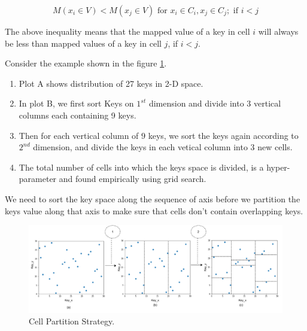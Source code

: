     $$ M(x_{i} \in V) <  M(x_{j} \in V) \text{ for } x_{i} \in C_{i}, x_{j} \in C_{j}; \text{ if } i<j$$
    
The above inequality means that the mapped value of a key in cell $i$ will always be less than mapped values of a key in cell $j$, if $i <j$.

\begin{mscexample}
	Consider the example shown in the figure \ref{fig:Cell_Parttion}.
	\begin{enumerate}
		\item Plot A shows distribution of 27 keys in 2-D space. 
		\item In plot B, we first sort Keys on $1^{st}$ dimension and divide into 3 vertical columns each containing 9 keys. 
		\item Then for each vertical column of $9$ keys, we sort the keys again according to $2^{nd}$ dimension, and divide the keys in each vetical column into $3$ new cells. 
		\item The total number of cells into which the keys space is divided, is a hyper-parameter and found empirically using grid search.
	\end{enumerate}
\end{mscexample}

We need to sort the key space along the sequence of axis before we partition the keys value along that axis to make sure that cells don't contain overlapping keys.

\begin{figure}[t]
    \centering
    \includegraphics[width=1\textwidth]{graphs/implementation/cell_generation.pdf}
    \caption{Cell Partition Strategy.}
    \label{fig:Cell_Parttion}
\end{figure}

